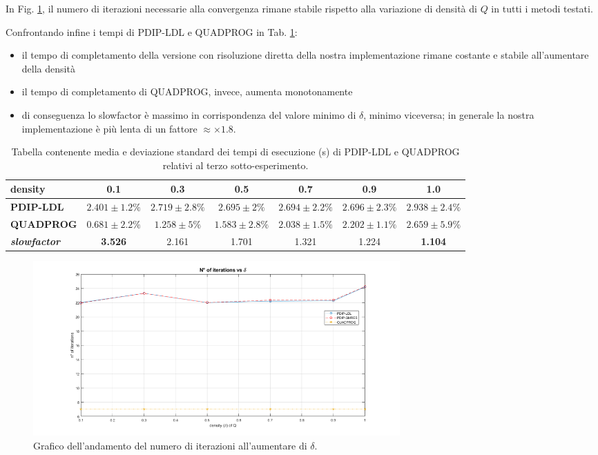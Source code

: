  In Fig. \ref{fig:exp3.2}, il numero di iterazioni necessarie alla convergenza rimane stabile rispetto alla variazione di densità di $Q$ in tutti i metodi testati. 
 
 Confrontando infine i tempi di PDIP-LDL e QUADPROG in Tab. \ref{tab:ldlqp3}:
 \begin{itemize}
     \item il tempo di completamento della versione con risoluzione diretta della nostra implementazione rimane costante e stabile all'aumentare della densità
     \item il tempo di completamento di QUADPROG, invece, aumenta monotonamente
     \item di conseguenza lo slowfactor è massimo in corrispondenza del valore minimo di $\delta$, minimo viceversa; in generale la nostra implementazione è più lenta di un fattore $\approx \times1.8$.
 \end{itemize}
\begin{table}[!h]
\centering
\begin{tabular}{l|c|c|c|c|c|c}
\textbf{density}                     & \textbf{0.1} & \textbf{0.3} & \textbf{0.5} & \textbf{0.7} & \textbf{0.9} & \textbf{1.0} \\ \hline
\textbf{PDIP-LDL}                    & $2.401 \pm 1.2\%$       & $2.719 \pm 2.8\%$       & $2.695  \pm 2\%$       & $2.694 \pm 2.2\%$       & $2.696 \pm 2.3\%$       & $2.938  \pm 2.4\%$       \\
\textbf{QUADPROG}                    & $0.681  \pm 2.2\%$      & $1.258  \pm 5\%$       & $1.583 \pm 2.8\%$       & $2.038 \pm 1.5\%$       & $2.202 \pm 1.1\%$       & $2.659 \pm 5.9\%$       \\
\textbf{\textit{slowfactor}} & \textbf{3.526}       & 2.161       & 1.701       & 1.321       & 1.224       & \textbf{1.104}
\end{tabular}
\caption{Tabella contenente media e deviazione standard dei tempi di esecuzione (s) di PDIP-LDL e QUADPROG relativi al terzo sotto-esperimento. \label{tab:ldlqp3}}
\end{table}


\begin{figure}[!h]
    \centering
    \includegraphics[width=\textwidth, height = 6.7cm]{img/MU9.png}
    \caption{Grafico dell'andamento del numero di iterazioni all'aumentare di $\delta$. \label{fig:exp3.2}}
\end{figure}

